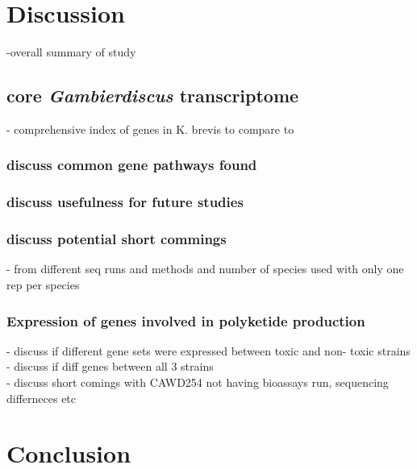 \documentclass[12pt]{article}
\begin{document}
\section*{Discussion}
-overall summary of study
\subsection*{core \textit{Gambierdiscus} transcriptome}
- \cite{lidie2005gene} comprehensive index of genes in K. brevis to compare to 
\subsubsection*{discuss common gene pathways found}
\subsubsection*{discuss usefulness for future studies}
\subsubsection*{discuss potential short commings} 
- from different seq runs and methods and number of species used with only one rep per species \\

\subsubsection*{Expression of genes involved in polyketide production}
- discuss if different gene sets were expressed between toxic and non- toxic strains\\
- discuss if diff genes between all 3 strains\\
- discuss short comings with CAWD254 not having bioassays run, sequencing differneces etc

\section*{Conclusion}


\newpage


\end{document}
